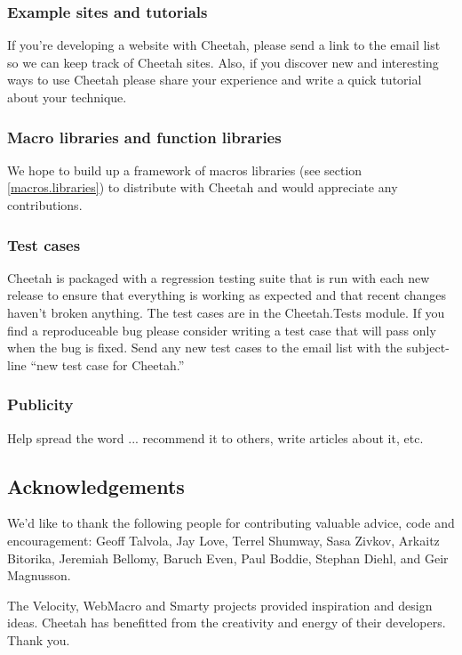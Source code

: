\subsubsection{Example sites and tutorials}
If you're developing a website with Cheetah, please send a link to the
email list so we can keep track of Cheetah sites.  Also, if you discover
new and interesting ways to use Cheetah please share your experience and
write a quick tutorial about your technique.

\subsubsection{Macro libraries and function libraries}
We hope to build up a framework of macros libraries (see section
\ref{macros.libraries}) to distribute with Cheetah and would appreciate
any contributions.

\subsubsection{Test cases}
Cheetah is packaged with a regression testing suite that is run with each
new release to ensure that everything is working as expected and that recent
changes haven't broken anything.  The test cases are in the Cheetah.Tests
module.  If you find a reproduceable bug please consider writing a test case
that will pass only when the bug is fixed.  Send any new test cases to the email
list with the subject-line ``new test case for Cheetah.''

\subsubsection{Publicity}
Help spread the word ... recommend it to others, write articles about it, etc.

\subsection{Acknowledgements}
\label{intro.acknowledgments}
    
We'd like to thank the following people for contributing valuable advice, code
and encouragement: Geoff Talvola, Jay Love, Terrel Shumway, Sasa Zivkov, Arkaitz
Bitorika, Jeremiah Bellomy, Baruch Even, Paul Boddie, Stephan Diehl, and Geir
Magnusson.
    
The Velocity, WebMacro and Smarty projects provided inspiration and design
ideas.  Cheetah has benefitted from the creativity and energy of their
developers. Thank you.


